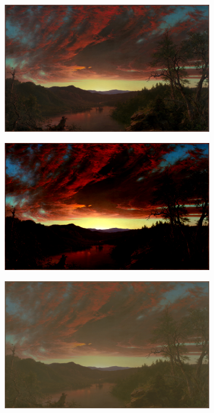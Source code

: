 \begin{figure}[!h]
    \centering
    \begin{subfigure}[b]{0.3\textwidth}
        \includegraphics[width=1\textwidth]{report_src/effects/original1.jpeg}
    \end{subfigure}
    \begin{subfigure}[b]{0.3\textwidth}
        \includegraphics[width=1\textwidth]{report_src/effects/contrast_high.jpeg}
    \end{subfigure}
    \begin{subfigure}[b]{0.3\textwidth}
        \includegraphics[width=1\textwidth]{report_src/effects/contrast_low.jpeg}
    \end{subfigure}
\end{figure} 

